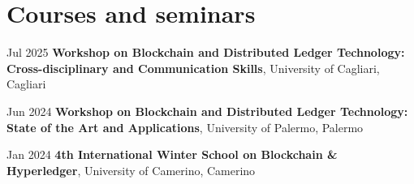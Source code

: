 \section{Courses and seminars}

    \begin{twocolentry}{Jul 2025}
    \textbf{Workshop on Blockchain and Distributed Ledger Technology: Cross-disciplinary and Communication Skills}, University of Cagliari, Cagliari
    \end{twocolentry}
    
    \abitspace
    
    \begin{twocolentry}{Jun 2024}
    \textbf{Workshop on Blockchain and Distributed Ledger Technology: State of the Art and Applications}, University of Palermo, Palermo
    \end{twocolentry}

    \abitspace

    \begin{twocolentry}{Jan 2024}
    \textbf{4th International Winter School on Blockchain \& Hyperledger}, University of Camerino, Camerino
    \end{twocolentry}